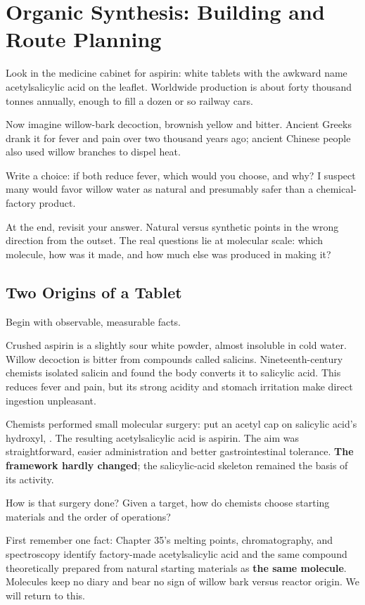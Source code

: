 \chapter{Organic Synthesis: Building and Route Planning}

\begin{kaichang}
Look in the medicine cabinet for aspirin: white tablets with the awkward name acetylsalicylic acid on the leaflet. Worldwide production is about forty thousand tonnes annually, enough to fill a dozen or so railway cars.

Now imagine willow-bark decoction, brownish yellow and bitter. Ancient Greeks drank it for fever and pain over two thousand years ago; ancient Chinese people also used willow branches to dispel heat.

Write a choice: if both reduce fever, which would you choose, and why? I suspect many would favor willow water as natural and presumably safer than a chemical-factory product.

At the end, revisit your answer. Natural versus synthetic points in the wrong direction from the outset. The real questions lie at molecular scale: which molecule, how was it made, and how much else was produced in making it?
\end{kaichang}

\section{Two Origins of a Tablet}

Begin with observable, measurable facts.

Crushed aspirin is a slightly sour white powder, almost insoluble in cold water. Willow decoction is bitter from compounds called salicins. Nineteenth-century chemists isolated salicin and found the body converts it to salicylic acid. This reduces fever and pain, but its strong acidity and stomach irritation make direct ingestion unpleasant.

Chemists performed small molecular surgery: put an acetyl cap on salicylic acid's hydroxyl, . The resulting acetylsalicylic acid is aspirin. The aim was straightforward, easier administration and better gastrointestinal tolerance. \textbf{The framework hardly changed}; the salicylic-acid skeleton remained the basis of its activity.

How is that surgery done? Given a target, how do chemists choose starting materials and the order of operations?

First remember one fact: Chapter 35's melting points, chromatography, and spectroscopy identify factory-made acetylsalicylic acid and the same compound theoretically prepared from natural starting materials as \textbf{the same molecule}. Molecules keep no diary and bear no sign of willow bark versus reactor origin. We will return to this.

